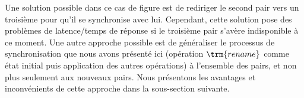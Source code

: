 Une solution possible dans ce cas de figure est de rediriger le second pair vers un troisième pour qu'il se synchronise avec lui.
Cependant, cette solution pose des problèmes de latence/temps de réponse si le troisième pair s'avère indisponible à ce moment.
Une autre approche possible est de généraliser le processus de synchronisation que nous avons présenté ici (opération $\trm{rename}$ comme état initial puis application des autres opérations) à l'ensemble des pairs, et non plus seulement aux nouveaux pairs.
Nous présentons les avantages et inconvénients de cette approche dans la sous-section suivante.


